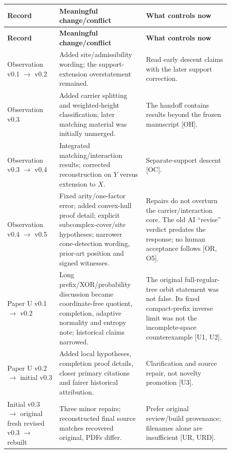 \documentclass[10pt,letterpaper]{article}
\begin{document}
\begingroup
\footnotesize
\setlength{\tabcolsep}{4pt}
\renewcommand{\arraystretch}{1.12}
\begin{longtable}{@{}P{0.210\linewidth}P{0.348\linewidth}P{0.348\linewidth}@{}}
\hline
\textbf{Record} & \textbf{Meaningful change/conflict} & \textbf{What controls now} \\ \hline
\endfirsthead
\hline
\textbf{Record} & \textbf{Meaningful change/conflict} & \textbf{What controls now} \\ \hline
\endhead
Observation v0.1 \ensuremath{\to} v0.2 & Added site/admissibility wording; the support-extension overstatement remained. & Read early descent claims with the later support correction. \\ \hline
Observation v0.3 & Added carrier splitting and weighted-height classification; later matching material was initially unmerged. & The handoff contains results beyond the frozen manuscript [OH]. \\ \hline
Observation v0.3 \ensuremath{\to} v0.4 & Integrated matching/interaction results; corrected reconstruction on \(Y\) versus extension to \(X\). & Separate-support descent [OC]. \\ \hline
Observation v0.4 \ensuremath{\to} v0.5 & Fixed arity/one-factor error; added convex-hull proof detail; explicit subcomplex-cover/site hypotheses; narrower cone-detection wording, prior-art position and signed witnesses. & Repairs do not overturn the carrier/interaction core. The old AI ``revise'' verdict predates the response; no human acceptance follows [OR, O5]. \\ \hline
Paper U v0.1 \ensuremath{\to} v0.2 & Long prefix/XOR/probability discussion became coordinate-free quotient, completion, adaptive normality and entropy note; historical claims narrowed. & The original full-regular-tree orbit statement was not false. Its fixed compact-prefix inverse limit was not the incomplete-space counterexample [U1, U2]. \\ \hline
Paper U v0.2 \ensuremath{\to} initial v0.3 & Added local hypotheses, completion proof details, closer primary citations and fairer historical attribution. & Clarification and source repair, not novelty promotion [U3]. \\ \hline
Initial v0.3 \ensuremath{\to} original fresh revised v0.3 \ensuremath{\to} rebuilt & Three minor repairs; reconstructed final source matches recovered original, PDFs differ. & Prefer original review/build provenance; filenames alone are insufficient [UR, URD]. \\ \hline

\end{longtable}
\end{document}
